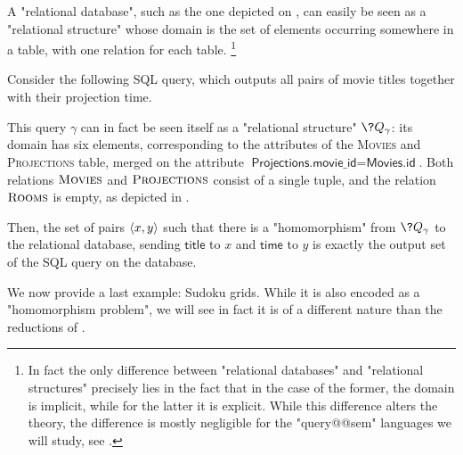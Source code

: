\begin{example}
	\AP\label{ex:sql-as-hom}
	A "relational database", such as the one depicted on
	, can easily be seen as a "relational structure"
	whose domain is the set of elements occurring somewhere in a table,
	with one relation for each table.%
	\marginnote{~}%
	\footnote{In fact the only difference between "relational databases" and "relational structures"
	precisely lies in the fact that in the case of the former, the domain is implicit,
	while for the latter it is explicit.
	While this difference alters the theory, the difference is mostly negligible
	for the "query@@sem" languages we will study, see .}

	Consider the following SQL query, which outputs all pairs
	of movie titles together with their projection time.
	

	This query $\gamma$ can in fact be seen itself as a "relational structure" $\?Q_\gamma$:
	its domain has six elements, corresponding to the attributes of
	the \textsc{Movies} and \textsc{Projections} table, merged on the attribute
	$\textsf{Projections.movie\_id} = \textsf{Movies.id}$.
	Both relations $\textsc{Movies}$ and $\textsc{Projections}$ consist of a single tuple,
	and the relation $\textsc{Rooms}$ is empty, as depicted in .

	Then, the set of pairs $\langle x, y\rangle$
	such that there is a "homomorphism" from $\?Q_\gamma$ to the relational database,
	sending $\textsf{title}$ to $x$ and $\textsf{time}$ to $y$
	is exactly the output set of the SQL query on the database.
\end{example}

We now provide a last example: Sudoku grids. While it is also encoded
as a "homomorphism problem", we will see in fact it
is of a different nature than the reductions of .

